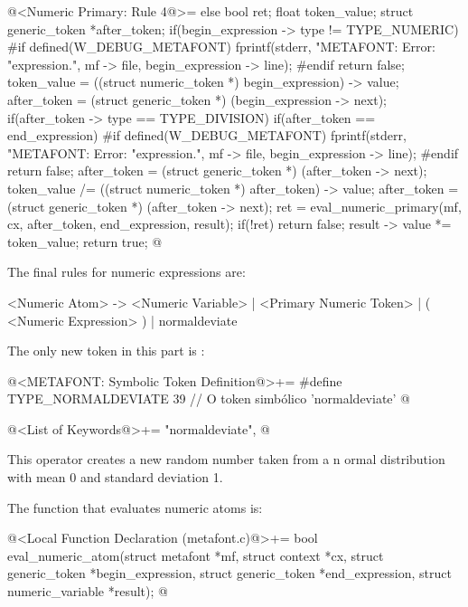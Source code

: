 \iniciocodigo
@<Numeric Primary: Rule 4@>=
else{
  bool ret;
  float token_value;
  struct generic_token *after_token;
  if(begin_expression -> type != TYPE_NUMERIC){
#if defined(W_DEBUG_METAFONT)
    fprintf(stderr, "METAFONT: Error: %
            "expression.\n", mf -> file, begin_expression -> line);
#endif
    return false;
  }
  token_value = ((struct numeric_token *) begin_expression) -> value;
  after_token = (struct generic_token *) (begin_expression -> next);
  if(after_token -> type == TYPE_DIVISION){
    if(after_token == end_expression){
#if defined(W_DEBUG_METAFONT)
      fprintf(stderr, "METAFONT: Error: %
              "expression.\n", mf -> file, begin_expression -> line);
#endif
      return false;
    }
    after_token = (struct generic_token *) (after_token -> next);
    token_value /= ((struct numeric_token *) after_token) -> value;
    after_token = (struct generic_token *) (after_token -> next);
  }
  ret = eval_numeric_primary(mf, cx, after_token, end_expression, result);
  if(!ret)
    return false;
  result -> value *= token_value;
  return true;
}
@
\fimcodigo


The final rules for numeric expressions are:

\alinhaverbatim
<Numeric Atom> -> <Numeric Variable> |
                  <Primary Numeric Token> |
                  ( <Numeric Expression> ) |
                  normaldeviate
\alinhanormal

The only new token in this part is :

\iniciocodigo
@<METAFONT: Symbolic Token Definition@>+=
#define TYPE_NORMALDEVIATE  39 // O token simbólico 'normaldeviate'
@
\fimcodigo

\iniciocodigo
@<List of Keywords@>+=
"normaldeviate",
@
\fimcodigo

This operator creates a new random number taken from a n ormal
distribution with mean 0 and standard deviation 1.

The function that evaluates numeric atoms is:

\iniciocodigo
@<Local Function Declaration (metafont.c)@>+=
bool eval_numeric_atom(struct metafont *mf, struct context *cx,
                       struct generic_token *begin_expression,
                       struct generic_token *end_expression,
                       struct numeric_variable *result);
@
\fimcodigo

